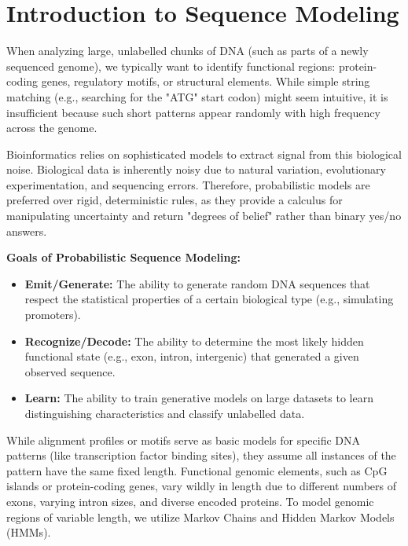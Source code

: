 
\section{Introduction to Sequence Modeling}

When analyzing large, unlabelled chunks of DNA (such as parts of a newly sequenced genome), we typically want to identify functional regions: protein-coding genes, regulatory motifs, or structural elements. While simple string matching (e.g., searching for the "ATG" start codon) might seem intuitive, it is insufficient because such short patterns appear randomly with high frequency across the genome.

Bioinformatics relies on sophisticated models to extract signal from this biological noise. Biological data is inherently noisy due to natural variation, evolutionary experimentation, and sequencing errors. Therefore, probabilistic models are preferred over rigid, deterministic rules, as they provide a calculus for manipulating uncertainty and return "degrees of belief" rather than binary yes/no answers.

\begin{important}
  \textbf{Goals of Probabilistic Sequence Modeling:}
  \begin{itemize}
      \item \textbf{Emit/Generate:} The ability to generate random DNA sequences that respect the statistical properties of a certain biological type (e.g., simulating promoters).
      \item \textbf{Recognize/Decode:} The ability to determine the most likely hidden functional state (e.g., exon, intron, intergenic) that generated a given observed sequence.
      \item \textbf{Learn:} The ability to train generative models on large datasets to learn distinguishing characteristics and classify unlabelled data.
  \end{itemize}
\end{important}

While alignment profiles or motifs serve as basic models for specific DNA patterns (like transcription factor binding sites), they assume all instances of the pattern have the same fixed length. Functional genomic elements, such as CpG islands or protein-coding genes, vary wildly in length due to different numbers of exons, varying intron sizes, and diverse encoded proteins. To model genomic regions of variable length, we utilize Markov Chains and Hidden Markov Models (HMMs).

